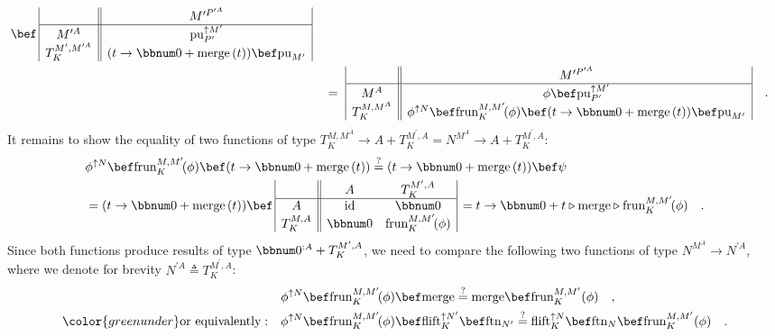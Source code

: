 \begin{align*}
\begin{array}{|c||cc|}
\end{array}\,\bef\,\begin{array}{|c||c|}
 & M^{\prime P^{\prime A}}\\
\hline M^{\prime A} & \text{pu}_{P^{\prime}}^{\uparrow M^{\prime}}\\
T_{K}^{M^{\prime},M^{\prime A}} & (t\rightarrow\bbnum 0+\text{merge}\,(t))\bef\text{pu}_{M^{\prime}}
\end{array}\\
 & \quad=\,\,\begin{array}{|c||c|}
 & M^{\prime P^{\prime A}}\\
\hline M^{A} & \phi\bef\text{pu}_{P^{\prime}}^{\uparrow M^{\prime}}\\
T_{K}^{M,M^{A}} & \phi^{\uparrow N}\bef\text{frun}_{K}^{M,M^{\prime}}\!(\phi)\bef(t\rightarrow\bbnum 0+\text{merge}\,(t))\bef\text{pu}_{M^{\prime}}
\end{array}\quad.
\end{align*}
It remains to show the equality of two functions of type $T_{K}^{M,M^{A}}\rightarrow A+T_{K}^{M^{\prime},A}=N^{M^{A}}\rightarrow A+T_{K}^{M^{\prime},A}$:
\begin{align*}
 & \phi^{\uparrow N}\bef\text{frun}_{K}^{M,M^{\prime}}\!(\phi)\bef(t\rightarrow\bbnum 0+\text{merge}\,(t))\overset{?}{=}(t\rightarrow\bbnum 0+\text{merge}\,(t))\bef\psi\\
 & =(t\rightarrow\bbnum 0+\text{merge}\,(t))\bef\,\begin{array}{|c||cc|}
 & A & T_{K}^{M^{\prime},A}\\
\hline A & \text{id} & \bbnum 0\\
T_{K}^{M,A} & \bbnum 0 & \text{frun}_{K}^{M,M^{\prime}}\!(\phi)
\end{array}\,=t\rightarrow\bbnum 0+t\triangleright\text{merge}\triangleright\text{frun}_{K}^{M,M^{\prime}}\!(\phi)\quad.
\end{align*}
Since both functions produce results of type $\bbnum 0^{:A}+T_{K}^{M^{\prime},A}$,
we need to compare the following two functions of type $N^{M^{A}}\rightarrow N^{\prime A}$,
where we denote for brevity $N^{\prime A}\triangleq T_{K}^{M^{\prime},A}$:
\begin{align}
 & \phi^{\uparrow N}\bef\text{frun}_{K}^{M,M^{\prime}}\!(\phi)\bef\text{merge}\overset{?}{=}\text{merge}\bef\text{frun}_{K}^{M,M^{\prime}}(\phi)\quad,\nonumber \\
{\color{greenunder}\text{or equivalently}:}\quad & \phi^{\uparrow N}\bef\text{frun}_{K}^{M,M^{\prime}}\!(\phi)\bef\text{flift}_{K}^{\uparrow N^{\prime}}\bef\text{ftn}_{N^{\prime}}\overset{?}{=}\text{flift}_{K}^{\uparrow N}\bef\text{ftn}_{N}\bef\text{frun}_{K}^{M,M^{\prime}}(\phi)\quad.\label{eq:free-pointed-sw-monadic-naturality-derivation1}
\end{align}
